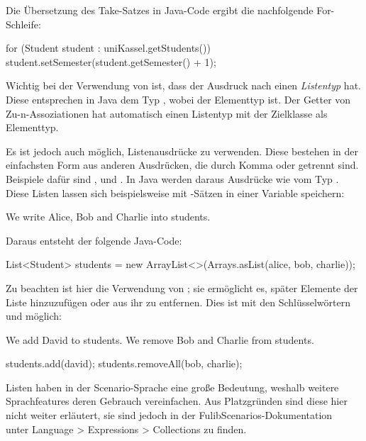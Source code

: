 Die Übersetzung des Take-Satzes in Java-Code ergibt die nachfolgende For-Schleife:

\begin{jcodeblock}
    for (Student student : uniKassel.getStudents()) {
        student.setSemester(student.getSemester() + 1);
    }
\end{jcodeblock}

Wichtig bei der Verwendung von  ist, dass der Ausdruck nach  einen \emph{Listentyp} hat.
Diese entsprechen in Java dem Typ , wobei  der Elementtyp ist.
Der Getter von Zu-n-Assoziationen hat automatisch einen Listentyp mit der Zielklasse als Elementtyp.

Es ist jedoch auch möglich, Listenausdrücke zu verwenden.
Diese bestehen in der einfachsten Form aus anderen Ausdrücken, die durch Komma oder  getrennt sind.
Beispiele dafür sind ,  und .
In Java werden daraus Ausdrücke wie  vom Typ .
Diese Listen lassen sich beispielsweise mit -Sätzen in einer Variable speichern:

\begin{codeblock}
    We write Alice, Bob and Charlie into students.
\end{codeblock}

Daraus entsteht der folgende Java-Code:

\begin{jcodeblock}
    List<Student> students = new ArrayList<>(Arrays.asList(alice, bob, charlie));
\end{jcodeblock}

Zu beachten ist hier die Verwendung von ;
sie ermöglicht es, später Elemente der Liste hinzuzufügen oder aus ihr zu entfernen.
Dies ist mit den Schlüsselwörtern  und  möglich:

\begin{codeblock}
    We add David to students.
    We remove Bob and Charlie from students.
\end{codeblock}

\begin{jcodeblock}
    students.add(david);
    students.removeAll(bob, charlie);
\end{jcodeblock}

Listen haben in der Scenario-Sprache eine große Bedeutung, weshalb weitere Sprachfeatures deren Gebrauch vereinfachen.
Aus Platzgründen sind diese hier nicht weiter erläutert, sie sind jedoch in der FulibScenarios-Dokumentation~\cite{documentation} unter Language > Expressions > Collections zu finden.

